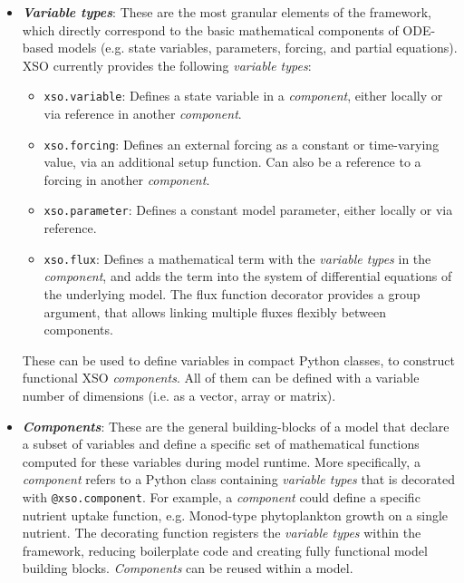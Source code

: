 \documentclass[journal abbreviation, manuscript]{copernicus}
\begin{document}
\begin{itemize}
    \item  \textbf{\textit{Variable types}}: These are the most granular elements of the framework, which directly correspond to the basic mathematical components of ODE-based models (e.g. state variables, parameters, forcing, and partial equations). XSO currently provides the following \textit{variable types}: 
    \begin{itemize}
        \item \texttt{xso.variable}: Defines a state variable in a \textit{component}, either locally or via reference in another \textit{component}.
        \item \texttt{xso.forcing}: Defines an external forcing as a constant or time-varying value, via an additional setup function. Can also be a reference to a forcing in another \textit{component}.
        \item \texttt{xso.parameter}: Defines a constant model parameter, either locally or via reference.
        \item \texttt{xso.flux}: Defines a mathematical term with the \textit{variable types} in the \textit{component}, and adds the term into the system of differential equations of the underlying model. The flux function decorator provides a group argument, that allows linking multiple fluxes flexibly between components.
    \end{itemize}
    These can be used to define variables in compact Python classes, to construct functional XSO \textit{components}. All of them can be defined with a variable number of dimensions (i.e. as a vector, array or matrix).

    \item \textbf{\textit{Components}}: These are the general building-blocks of a model that declare a subset of variables and define a specific set of mathematical functions computed for these variables during model runtime. More specifically, a \textit{component} refers to a Python class containing \textit{variable types} that is decorated with \texttt{@xso.component}. For example, a \textit{component} could define a specific nutrient uptake function, e.g. Monod-type phytoplankton growth on a single nutrient. The decorating function registers the \textit{variable types} within the framework, reducing boilerplate code and creating fully functional model building blocks. \textit{Components} can be reused within a model.
    

\end{itemize}
\end{document}
